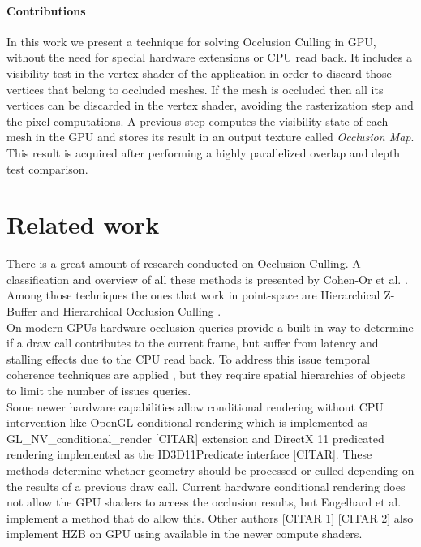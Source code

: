 \documentclass[10pt, conference]{IEEEtran}
\begin{document}
\paragraph*{Contributions}
%
In this work we present a technique for solving Occlusion Culling in GPU, without the need for special hardware extensions or CPU read back. 
It includes a visibility test in the vertex shader of the application in order to discard those vertices that belong to occluded meshes. 
If the mesh is occluded then all its vertices can be discarded in the vertex shader, avoiding the rasterization step and the pixel computations. 
A previous step computes the visibility state of each mesh in the GPU and stores its result in an output texture called \emph{Occlusion Map}. 
This result is acquired after performing a highly parallelized overlap and depth test comparison.


\section{Related work}
%
There is a great amount of research conducted on Occlusion Culling. 
A classification and overview of all these methods is presented by Cohen-Or et al. \cite{survey_visibility}. 
Among those techniques the ones that work in point-space are Hierarchical Z-Buffer \cite{Hierarchical_zbuffer} and Hierarchical Occlusion Culling \cite{hom}.\\

On modern GPUs hardware occlusion queries \cite{occlusion_queries} provide a built-in way to determine if a draw call contributes to the current frame, 
but suffer from latency and stalling effects due to the CPU read back. 
To address this issue temporal coherence techniques are applied \cite{occlusion_queries_2}\cite{occlusion_queries_3}, but they require spatial hierarchies of objects to limit the number 
of issues queries.\\

Some newer hardware capabilities allow conditional rendering without CPU intervention like OpenGL conditional rendering  which is implemented as 
GL\_NV\_conditional\_render [CITAR] extension and DirectX 11 predicated rendering implemented as the ID3D11Predicate interface [CITAR]. 
These methods determine whether geometry should be processed or culled depending on the results of a previous draw call. 
Current hardware conditional rendering does not allow the GPU shaders to access the occlusion results, but Engelhard et al. \cite{visibility_queries} implement a method that do allow this. 
Other authors [CITAR 1] [CITAR 2] also implement HZB on GPU using available in the newer compute shaders.\\
\end{document}
